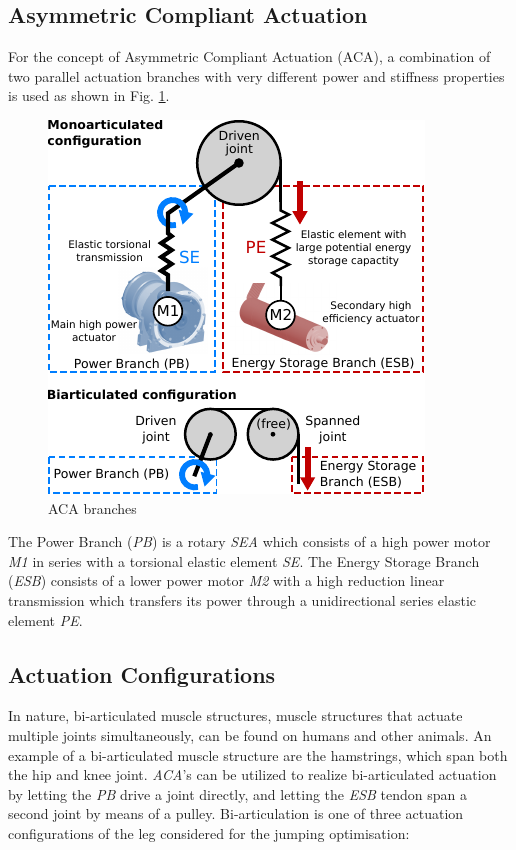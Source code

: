 \documentclass[letterpaper, 10 pt, conference]{ieeeconf}  %
\begin{document}
\subsection{Asymmetric Compliant Actuation}

For the concept of Asymmetric Compliant Actuation (ACA), a combination of two parallel actuation branches with very different power and stiffness properties is used as shown in Fig. \ref{fig:ACA}.



\begin{figure}[b]
	\centering
	\includegraphics[scale=1.0]{actuationConcept}
	\caption{ACA branches}
	\label{fig:ACA}
\end{figure}

 The Power Branch (\textit{PB}) is a rotary \textit{SEA} which consists of a high power motor \textit{M1} in series with a torsional elastic element \textit{SE}. The Energy Storage Branch (\textit{ESB}) consists of a lower power motor \textit{M2} with a high reduction linear transmission which transfers its power through a unidirectional series elastic element \textit{PE}.

\subsection{Actuation Configurations}
In nature, bi-articulated muscle structures, muscle structures that actuate multiple joints simultaneously, can be found on humans and other animals. An example of a bi-articulated muscle structure are the hamstrings, which span both the hip and knee joint. \textit{ACA}'s can be utilized to realize bi-articulated actuation by letting the \textit{PB} drive a joint directly, and letting the \textit{ESB} tendon span a second joint by means of a pulley. Bi-articulation is one of three actuation configurations of the leg considered for the jumping optimisation:
\end{document}
